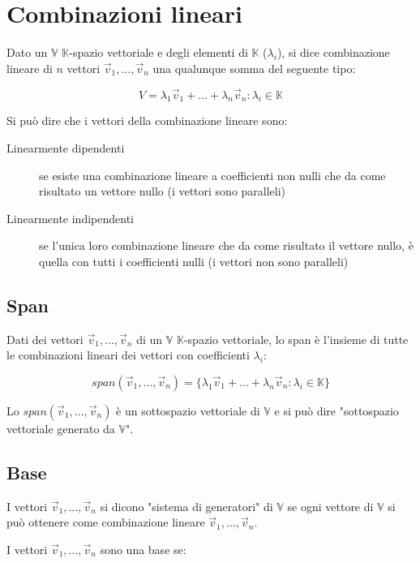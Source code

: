 \documentclass{subfiles}
\begin{document}
\section{Combinazioni lineari}

Dato un $\mathbb{V}$ $\mathbb{K}$-spazio vettoriale e degli elementi di $\mathbb{K}$ ($\lambda_i$), si dice combinazione lineare di $n$ vettori $\vec{v}_1, \dots, \vec{v}_n$ una qualunque somma del seguente tipo:

$$
V = \lambda_1 \vec{v}_1 + \dots + \lambda_n \vec{v}_n : \lambda_i \in \mathbb{K}
$$

\noindent
Si può dire che i vettori della combinazione lineare sono:

\begin{description}
    \item[Linearmente dipendenti] se esiste una combinazione lineare a coefficienti non nulli che da come risultato un vettore nullo (i vettori sono paralleli)
    \item[Linearmente indipendenti] se l'unica loro combinazione lineare che da come risultato il vettore nullo, è quella con tutti i coefficienti nulli (i vettori non sono paralleli)
\end{description}

\subsection{Span}

Dati dei vettori $\vec{v}_1, \dots, \vec{v}_n$ di un $\mathbb{V}$ $\mathbb{K}$-spazio vettoriale, lo span è l'insieme di tutte le combinazioni lineari dei vettori con coefficienti $\lambda_i$:

$$
span(\vec{v}_1, \dots, \vec{v}_n) = \{ \lambda_1 \vec{v}_1 + \dots + \lambda_n \vec{v}_n : \lambda_i \in \mathbb{K} \}
$$

\noindent
Lo $span(\vec{v}_1, \dots, \vec{v}_n)$ è un sottospazio vettoriale di $\mathbb{V}$ e si può dire "sottospazio vettoriale generato da $\mathbb{V}$".

\subsection{Base}

I vettori $\vec{v}_1, \dots, \vec{v}_n$ si dicono "sistema di generatori" di $\mathbb{V}$ se ogni vettore di $\mathbb{V}$ si può ottenere come combinazione lineare $\vec{v}_1, \dots, \vec{v}_n$.

\noindent
I vettori $\vec{v}_1, \dots, \vec{v}_n$ sono una base se:
\end{document}
